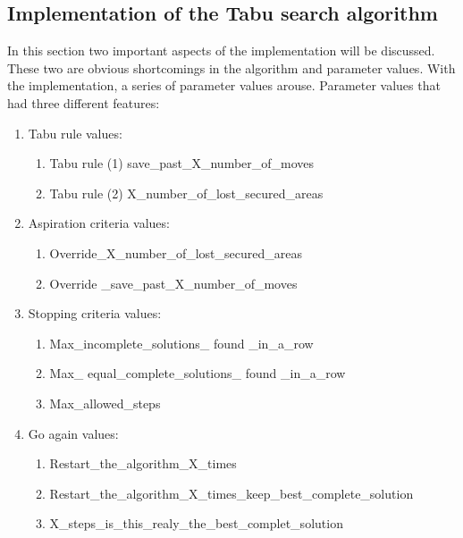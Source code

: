 \subsection{Implementation of the Tabu search algorithm}
In this section two important aspects of the implementation will be discussed. These two are obvious shortcomings in the algorithm and parameter values. With the implementation, a series of parameter values arouse. Parameter values that had three different features:
\begin{enumerate}
\item{} Tabu rule values:
\begin{enumerate}
\item{} Tabu rule (1)  save\_past\_X\_number\_of\_moves 
\item{} Tabu rule (2)  X\_number\_of\_lost\_secured\_areas
\end{enumerate} 
\item{} Aspiration criteria values:
\begin{enumerate}
\item{} Override\_X\_number\_of\_lost\_secured\_areas
\item{} Override \_save\_past\_X\_number\_of\_moves
\end{enumerate} 
\item{} Stopping criteria values:
\begin{enumerate}
\item{} Max\_incomplete\_solutions\_ found \_in\_a\_row
\item{} Max\_ equal\_complete\_solutions\_ found \_in\_a\_row
\item{} Max\_allowed\_steps
\end{enumerate} 
\item{} Go again values:
\begin{enumerate}
\item{} Restart\_the\_algorithm\_X\_times
\item{} Restart\_the\_algorithm\_X\_times\_keep\_best\_complete\_solution
\item{} X\_steps\_is\_this\_realy\_the\_best\_complet\_solution
\end{enumerate} 
\end{enumerate} 

